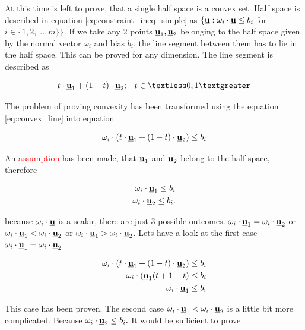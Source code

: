 \documentclass{article}
\newcommand{\uvec}{\textbf{\underline{u}}}
\begin{document}
At this time is left to prove, that a single half space is a convex set. Half space is described in equation \ref{eq:constraint_ineq_simple} as $\{\uvec : \omega_i \cdot \uvec \leq b_i$ for $i \in \{1, 2, ..., m\}\}$. If we take any 2 points $\uvec_1, \uvec_2$ belonging to the half space given by the normal vector $\omega_i$ and bias $b_i$, the line segment between them has to lie in the half space. This can be proved for any dimension. The line segment is described as

\begin{equation}
\label{eq:convex_line}
t \cdot \uvec_1 + (1-t) \cdot \uvec_2; \;\;\; t \in \textless 0, 1 \textgreater
\end{equation}

The problem of proving convexity has been transformed using the equation \ref{eq:convex_line} into equation 

\begin{equation}
\label{eq:convex_u_proof}
\omega_i \cdot (t \cdot \uvec_1 + (1-t) \cdot \uvec_2) \leq b_i
\end{equation}


An \textcolor{red}{assumption} has been made, that $\uvec_1$ and $\uvec_2$ belong to the half space, therefore 

\begin{equation}
\begin{split}
\omega_i \cdot \uvec_1 \leq b_i\\
\omega_i \cdot \uvec_2 \leq b_i.
\end{split}
\end{equation}

because $\omega_i \cdot \uvec$ is a scalar, there are just 3 possible outcomes. $\omega_i \cdot \uvec_1 = \omega_i \cdot \uvec_2$ or $\omega_i \cdot \uvec_1 < \omega_i \cdot \uvec_2$ or $\omega_i \cdot \uvec_1 > \omega_i \cdot \uvec_2$. Lets have a look at the first case $\omega_i \cdot \uvec_1 = \omega_i \cdot \uvec_2:$


\begin{equation}
\begin{split}
\omega_i \cdot (t \cdot \uvec_1 + (1-t) \cdot \uvec_2) \leq b_i\\
\omega_i \cdot (\uvec_1(t+1-t) \leq b_i\\
\omega_i \cdot \uvec_1 \leq b_i
\end{split}
\end{equation}

This case has been proven. The second case $\omega_i \cdot \uvec_1 < \omega_i \cdot \uvec_2$ is a little bit more complicated. Because $\omega_i \cdot \uvec_2 \leq b_i.$ It would be sufficient to prove 
\end{document}

